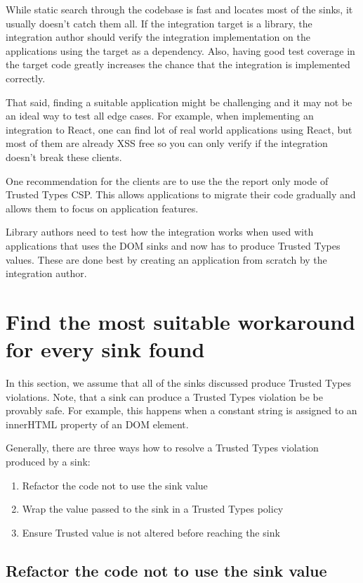 While static search through the codebase is fast and locates most of the sinks, it usually doesn't
catch them all. If the integration target is a library, the integration author should verify the
integration implementation on the applications using the target as a dependency. Also, having good
test coverage in the target code greatly increases the chance that the integration is
implemented correctly.

That said, finding a suitable application might be challenging and it may not be an ideal way to
test all edge cases. For example, when implementing an integration to React, one can find lot of
real world applications using React, but most of them are already XSS free so you can only verify if
the integration doesn't break these clients.

One recommendation for the clients are to use the the report only mode of Trusted Types CSP. This
allows applications to migrate their code gradually and allows them to focus on application
features.

Library authors need to test how the integration works when used with applications that uses the
DOM sinks and now has to produce Trusted Types values. These are done best by creating an
application from scratch by the integration author.

\section{Find the most suitable workaround for every sink found}

In this section, we assume that all of the sinks discussed produce Trusted Types violations. Note,
that a sink can produce a Trusted Types violation be be provably safe. For example, this happens
when a constant string is assigned to an innerHTML property of an DOM element.

Generally, there are three ways how to resolve a Trusted Types violation produced by a sink:

\begin{enumerate}
  \item Refactor the code not to use the sink value
  \item Wrap the value passed to the sink in a Trusted Types policy
  \item Ensure Trusted value is not altered before reaching the sink
\end{enumerate}

\subsection{Refactor the code not to use the sink value}

